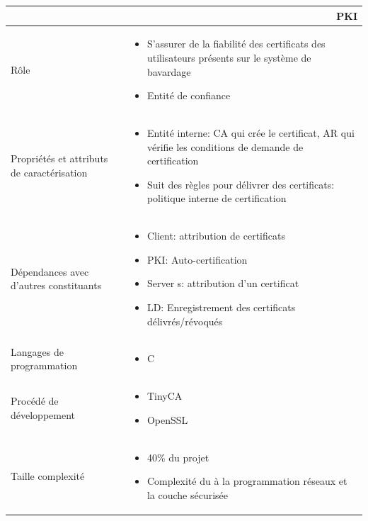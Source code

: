 \documentclass[a4paper,11pt,french]{article}
\begin{document}
\begin{center}
	\vspace*{0.7cm}
	\begin{tabularx}{16cm}{|l|X|}
	\hline
	\multicolumn{2}{|r|}{\textbf{PKI}}\\
	\hline
	R\^ole &  \begin{itemize}\item S'assurer de la fiabilité des certificats des utilisateurs présents sur le système de bavardage \item Entité de  confiance \end{itemize}\\
	\hline
	Propriétés et attributs de caractérisation & \begin{itemize}\item Entité interne: CA qui crée le certificat, AR qui vérifie les conditions de demande de certification \item Suit des règles pour délivrer des certificats: politique interne de  certification \end{itemize} \\
	\hline
	Dépendances avec d'autres constituants & \begin{itemize}\item Client: attribution de  certificats \item PKI: Auto-certification \item Server s: attribution d'un certificat \item LD: Enregistrement des certificats délivrés/révoqués \end{itemize} \\
	\hline
	Langages de programmation & \begin{itemize} \item C \end{itemize}\\
	\hline
	Procédé de développement & \begin{itemize}\item TinyCA \item OpenSSL \end{itemize}\\
	\hline
	Taille complexité & \begin{itemize}\item 40\% du projet \item Complexité du à la programmation réseaux et la couche sécurisée \end{itemize}\\
	\hline
	\end{tabularx}
\end{center}
\end{document}
